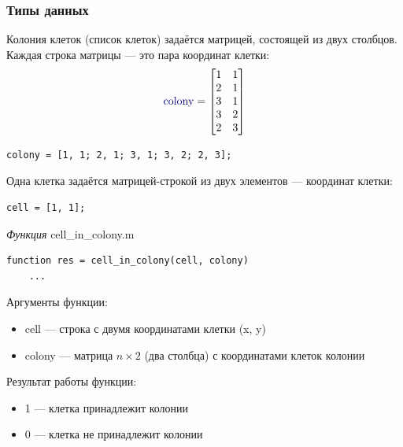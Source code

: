 \documentclass[12pt, compress]{beamer}
\begin{document}
\begin{frame}[c,fragile]
\frametitle{Типы данных}
Колония клеток (список клеток) задаётся матрицей, состоящей из двух столбцов. Каждая строка матрицы — это пара координат клетки:
$$
  \emph{\text{colony}} = \begin{bmatrix}1 & 1 \\ 2 & 1 \\ 3 & 1 \\ 3 & 2 \\ 2 & 3 \end{bmatrix}
$$  
\begin{lstlisting}
colony = [1, 1; 2, 1; 3, 1; 3, 2; 2, 3];
\end{lstlisting}
Одна клетка задаётся матрицей-строкой из двух элементов — координат клетки:
\begin{lstlisting}
cell = [1, 1];
\end{lstlisting}
\end{frame}


\begin{frame}[fragile]{\emph{Функция} cell\_in\_colony.m}
\begin{lstlisting}
function res = cell_in_colony(cell, colony)  
    ...
\end{lstlisting}     
Аргументы функции:
\begin{itemize}
  \item cell — строка с двумя координатами клетки (x, y) 
  \item colony — матрица $n \times 2$ (два столбца) с координатами клеток колонии
\end{itemize}

Результат работы функции:
\begin{itemize}
  \item 1 — клетка принадлежит колонии
  \item 0 — клетка не принадлежит колонии
\end{itemize}
\end{frame} 
\end{document}
